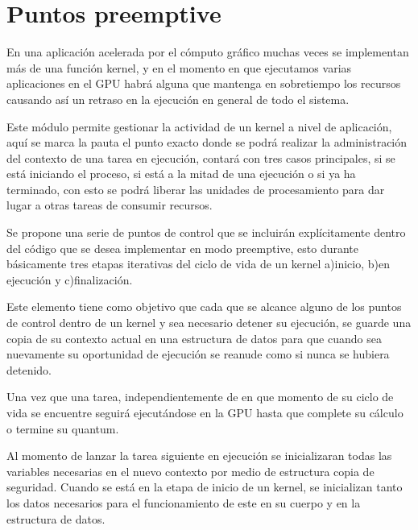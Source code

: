 \section{Puntos preemptive}\label{secc:puntosPreemptive}


En una aplicación acelerada por el cómputo gráfico muchas veces se implementan más de una función kernel, y en el momento en que ejecutamos varias aplicaciones en el GPU habrá alguna que mantenga en sobretiempo los recursos causando así un retraso en la ejecución en general de todo el sistema.
\newline

Este módulo permite gestionar la actividad de un kernel a nivel de aplicación, aquí se marca la pauta el punto exacto donde se podrá realizar la administración del contexto de una tarea en ejecución, contará con tres casos principales, si se está iniciando el proceso, si está a la mitad de una ejecución o si ya ha terminado, con esto se podrá liberar las unidades de procesamiento para dar lugar a otras tareas de consumir recursos.
\newline

Se propone una serie de puntos de control que se incluirán explícitamente dentro del código que se desea implementar en modo preemptive, esto durante básicamente tres etapas iterativas del ciclo de vida de un kernel a)inicio, b)en ejecución y c)finalización. 
\newline

Este elemento tiene como objetivo que cada que se alcance alguno de los puntos de control dentro de un kernel y sea necesario detener su ejecución, se guarde una copia de su contexto actual en una estructura de datos para que cuando sea nuevamente su oportunidad de ejecución se reanude como si nunca se hubiera detenido. 
\newline

Una vez que una tarea, independientemente de en que momento de su ciclo de vida se encuentre seguirá ejecutándose en la GPU hasta que complete su cálculo o termine su quantum.
\newline

Al momento de lanzar la tarea siguiente en ejecución se inicializaran todas las variables necesarias en el nuevo contexto por medio de estructura copia de seguridad. Cuando se está en la etapa de inicio de un kernel, se inicializan tanto los datos necesarios para el funcionamiento de este en su cuerpo y en la estructura de datos.
\newline

